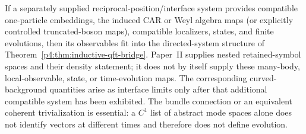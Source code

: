 \documentclass[12pt,a4paper]{article}
\begin{document}
\begin{theorem}
If a separately supplied reciprocal-position/interface system provides
compatible one-particle embeddings, the induced CAR or Weyl algebra maps
(or explicitly controlled truncated-boson maps), compatible localizers,
states, and finite evolutions, then its observables fit into the
directed-system structure of
Theorem~\ref{p4:thm:inductive-qft-bridge}.  Paper~II supplies nested
retained-symbol spaces and their density statement; it does not by itself
supply these many-body, local-observable, state, or time-evolution maps.
The corresponding curved-background quantities arise as interface limits
only after that additional compatible system has been exhibited.
The bundle connection or an equivalent coherent trivialization is essential:
a \(C^1\) list of abstract mode spaces alone does not identify vectors at
different times and therefore does not define evolution.
\end{theorem}
\end{document}

